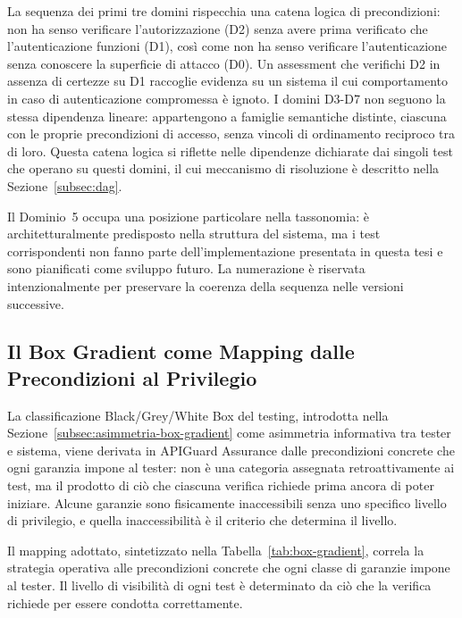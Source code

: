 

La sequenza dei primi tre domini rispecchia una catena logica di precondizioni: non ha senso verificare l'autorizzazione (D2) senza avere prima verificato che l'autenticazione funzioni (D1), così come non ha senso verificare l'autenticazione senza conoscere la superficie di attacco (D0). Un assessment che verifichi D2 in assenza di certezze su D1 raccoglie evidenza su un sistema il cui comportamento in caso di autenticazione compromessa è ignoto. I domini D3-D7 non seguono la stessa dipendenza lineare: appartengono a famiglie semantiche distinte, ciascuna con le proprie precondizioni di accesso, senza vincoli di ordinamento reciproco tra di loro. Questa catena logica si riflette nelle dipendenze dichiarate dai singoli test che operano su questi domini, il cui meccanismo di risoluzione è descritto nella Sezione~\ref{subsec:dag}.

Il Dominio~5 occupa una posizione particolare nella tassonomia: è architetturalmente predisposto nella struttura del sistema, ma i test corrispondenti non fanno parte dell'implementazione presentata in questa tesi e sono pianificati come sviluppo futuro. La numerazione è riservata intenzionalmente per preservare la coerenza della sequenza nelle versioni successive.


\subsection{Il Box Gradient come Mapping dalle Precondizioni al Privilegio}\label{subsec:box-gradient}

La classificazione Black/Grey/White Box del testing, introdotta nella Sezione~\ref{subsec:asimmetria-box-gradient} come asimmetria informativa tra tester e sistema, viene derivata in APIGuard Assurance dalle precondizioni concrete che ogni garanzia impone al tester: non è una categoria assegnata retroattivamente ai test, ma il prodotto di ciò che ciascuna verifica richiede prima ancora di poter iniziare. Alcune garanzie sono fisicamente inaccessibili senza uno specifico livello di privilegio, e quella inaccessibilità è il criterio che determina il livello.

Il mapping adottato, sintetizzato nella Tabella~\ref{tab:box-gradient}, correla la strategia operativa alle precondizioni concrete che ogni classe di garanzie impone al tester.
Il livello di visibilità di ogni test è determinato da ciò che la verifica richiede per essere condotta correttamente.

